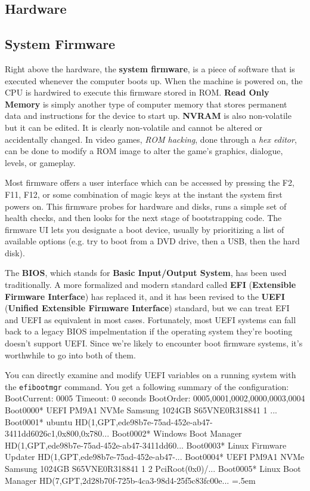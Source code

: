 \documentclass{article}
\theoremstyle{definition}
\newenvironment{cverbatim}
    {\SaveVerbatim{cverb}}
    {\endSaveVerbatim
    \flushleft\fboxrule=0pt\fboxsep=.5em
    \colorbox{cverbbg}{%
      \makebox[\dimexpr\linewidth-2\fboxsep][l]{\BUseVerbatim{cverb}}%
    }
    \endflushleft
  }
\begin{document}
  
  \subsection{Hardware}


  \subsection{System Firmware}

  Right above the hardware, the \textbf{system firmware}, is a piece of software that is executed whenever the computer boots up. When the machine is powered on, the CPU is hardwired to execute this firmware stored in ROM. \textbf{Read Only Memory} is simply another type of computer memory that stores permanent data and instructions for the device to start up. \textbf{NVRAM} is also non-volatile but it can be edited. It is clearly non-volatile and cannot be altered or accidentally changed. In video games, \textit{ROM hacking}, done through a \textit{hex editor}, can be done to modify a ROM image to alter the game's graphics, dialogue, levels, or gameplay. 

  Most firmware offers a user interface which can be accessed by pressing the F2, F11, F12, or some combination of magic keys at the instant the system first powers on. This firmware probes for hardware and disks, runs a simple set of health checks, and then looks for the next stage of bootstrapping code. The firmware UI lets you designate a boot device, usually by prioritizing a list of available options (e.g. try to boot from a DVD drive, then a USB, then the hard disk). 

  The \textbf{BIOS}, which stands for \textbf{Basic Input/Output System}, has been used traditionally. A more formalized and modern standard called \textbf{EFI} (\textbf{Extensible Firmware Interface}) has replaced it, and it has been revised to the \textbf{UEFI} (\textbf{Unified Extensible Firmware Interface}) standard, but we can treat EFI and UEFI as equivalent in most cases. Fortunately, most UEFI systems can fall back to a legacy BIOS impelmentation if the operating system they're booting doesn't support UEFI. Since we're likely to encounter boot firmware systems, it's worthwhile to go into both of them. 

  You can directly examine and modify UEFI variables on a running system with the \texttt{efibootmgr} command. You get a following summary of the configuration: 
  \begin{cverbatim}
    BootCurrent: 0005
    Timeout: 0 seconds
    BootOrder: 0005,0001,0002,0000,0003,0004
    Boot0000* UEFI PM9A1 NVMe Samsung 1024GB S65VNE0R318841 1	...
    Boot0001* ubuntu	HD(1,GPT,ede98b7e-75ad-452e-ab47-3411dd6026c1,0x800,0x780...
    Boot0002* Windows Boot Manager	HD(1,GPT,ede98b7e-75ad-452e-ab47-3411dd60...
    Boot0003* Linux Firmware Updater	HD(1,GPT,ede98b7e-75ad-452e-ab47-...
    Boot0004* UEFI PM9A1 NVMe Samsung 1024GB S65VNE0R318841 1 2	PciRoot(0x0)/...
    Boot0005* Linux Boot Manager	HD(7,GPT,2d28b70f-725b-4ca3-98d4-25f5c83fc00e...
  \end{cverbatim}
\end{document}
